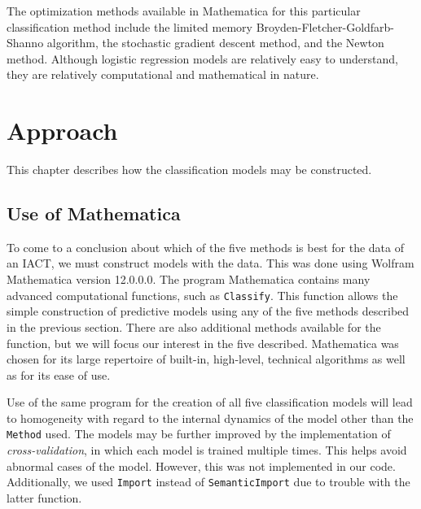 \documentclass[a4paper, 12pt]{report}
\theoremstyle{definition}
\begin{document}
The optimization methods available in Mathematica for this particular classification method include the limited memory Broyden-Fletcher-Goldfarb-Shanno algorithm, the stochastic gradient descent method, and the Newton method. Although logistic regression models are relatively easy to understand, they are relatively computational and mathematical in nature.

\chapter{Approach}

This chapter describes how the classification models may be constructed.

\section{Use of Mathematica}

To come to a conclusion about which of the five methods is best for the data of an IACT, we must construct models with the data. This was done using Wolfram Mathematica version 12.0.0.0. The program Mathematica contains many advanced computational functions, such as \texttt{Classify}. This function allows the simple construction of predictive models using any of the five methods described in the previous section. There are also additional methods available for the function, but we will focus our interest in the five described. Mathematica was chosen for its large repertoire of built-in, high-level, technical algorithms as well as for its ease of use. 

Use of the same program for the creation of all five classification models will lead to homogeneity with regard to the internal dynamics of the model other than the \texttt{Method} used. The models may be further improved by the implementation of \textit{cross-validation}, in which each model is trained multiple times. This helps avoid abnormal cases of the model. However, this was not implemented in our code. Additionally, we used \texttt{Import} instead of \texttt{SemanticImport} due to trouble with the latter function.

\newpage
\end{document}
